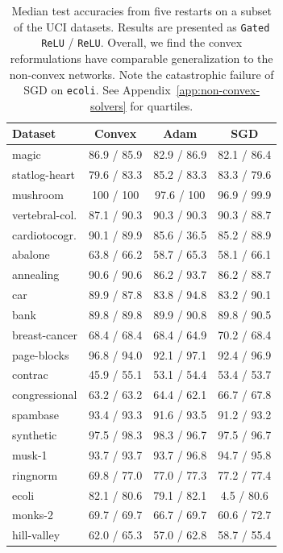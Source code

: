 \begin{table}[t]
	\centering
	\caption{Median test accuracies from five restarts on a subset of the UCI datasets.
		Results are presented as \texttt{Gated ReLU} / \texttt{ReLU}.
		Overall, we find the convex reformulations have comparable generalization to the non-convex networks.
		Note the catastrophic failure of SGD on \texttt{ecoli}.
		See Appendix~\ref{app:non-convex-solvers} for quartiles.}%
	\label{table:non-convex-solvers}
	\vspace{0.1in}
	\begin{small}
		\begin{tabular}{lccc} \toprule
			\textbf{Dataset} & \textbf{Convex} & \textbf{Adam} & \textbf{SGD} \\ \midrule
			magic            & 86.9  / 85.9    & 82.9 / 86.9   & 82.1 / 86.4  \\
			statlog-heart    & 79.6  / 83.3    & 85.2 / 83.3   & 83.3 / 79.6  \\
			mushroom         & 100 / 100       & 97.6 / 100    & 96.9 / 99.9  \\
			vertebral-col.   & 87.1  / 90.3    & 90.3 / 90.3   & 90.3 / 88.7  \\
			cardiotocogr.    & 90.1  / 89.9    & 85.6 / 36.5   & 85.2 / 88.9  \\
			abalone          & 63.8  / 66.2    & 58.7 / 65.3   & 58.1 / 66.1  \\
			annealing        & 90.6  / 90.6    & 86.2 / 93.7   & 86.2 / 88.7  \\
			car              & 89.9  / 87.8    & 83.8 / 94.8   & 83.2 / 90.1  \\
			bank             & 89.8  / 89.8    & 89.9 / 90.8   & 89.8 / 90.5  \\
			breast-cancer    & 68.4  / 68.4    & 68.4 / 64.9   & 70.2 / 68.4  \\
			page-blocks      & 96.8  / 94.0    & 92.1 / 97.1   & 92.4 / 96.9  \\
			contrac          & 45.9  / 55.1    & 53.1 / 54.4   & 53.4 / 53.7  \\
			congressional    & 63.2  / 63.2    & 64.4 / 62.1   & 66.7 / 67.8  \\
			spambase         & 93.4  / 93.3    & 91.6 / 93.5   & 91.2 / 93.2  \\
			synthetic        & 97.5  / 98.3    & 98.3 / 96.7   & 97.5 / 96.7  \\
			musk-1           & 93.7  / 93.7    & 93.7 / 96.8   & 94.7 / 95.8  \\
			ringnorm         & 69.8  / 77.0    & 77.0 / 77.3   & 77.2 / 77.4  \\
			ecoli            & 82.1  / 80.6    & 79.1 / 82.1   & 4.5  / 80.6  \\
			monks-2          & 69.7  / 69.7    & 66.7 / 69.7   & 60.6 / 72.7  \\
			hill-valley      & 62.0  / 65.3    & 57.0 / 62.8   & 58.7 / 55.4  \\ \bottomrule
		\end{tabular}
	\end{small}
\end{table}

